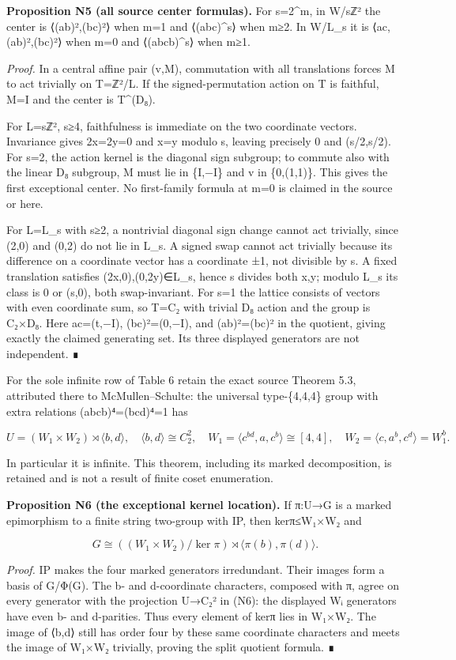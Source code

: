 \documentclass[
  10pt,
  letterpaper,
]{article}
\begin{document}
\textbf{Proposition N5 (all source center formulas).} For s=2\^{}m, in
W/sℤ² the center is ⟨(ab)²,(bc)²⟩ when m=1 and ⟨(abc)\^{}s⟩ when m≥2. In
W/L\_s it is ⟨ac,(ab)²,(bc)²⟩ when m=0 and ⟨(abcb)\^{}s⟩ when m≥1.

\emph{Proof.} In a central affine pair (v,M), commutation with all
translations forces M to act trivially on T=ℤ²/L. If the
signed-permutation action on T is faithful, M=I and the center is
T\^{}(D₈).

For L=sℤ², s≥4, faithfulness is immediate on the two coordinate vectors.
Invariance gives 2x=2y=0 and x=y modulo s, leaving precisely 0 and
(s/2,s/2). For s=2, the action kernel is the diagonal sign subgroup; to
commute also with the linear D₈ subgroup, M must lie in \{I,−I\} and v
in \{0,(1,1)\}. This gives the first exceptional center. No first-family
formula at m=0 is claimed in the source or here.

For L=L\_s with s≥2, a nontrivial diagonal sign change cannot act
trivially, since (2,0) and (0,2) do not lie in L\_s. A signed swap
cannot act trivially because its difference on a coordinate vector has a
coordinate ±1, not divisible by s. A fixed translation satisfies
(2x,0),(0,2y)∈L\_s, hence s divides both x,y; modulo L\_s its class is 0
or (s,0), both swap-invariant. For s=1 the lattice consists of vectors
with even coordinate sum, so T=C₂ with trivial D₈ action and the group
is C₂×D₈. Here ac=(t,−I), (bc)²=(0,−I), and (ab)²=(bc)² in the quotient,
giving exactly the claimed generating set. Its three displayed
generators are not independent. ∎

For the sole infinite row of Table 6 retain the exact source Theorem
5.3, attributed there to McMullen--Schulte: the universal type-\{4,4,4\}
group with extra relations (abcb)⁴=(bcd)⁴=1 has

\[
U=(W_1\times W_2)\rtimes\langle b,d\rangle,
\quad \langle b,d\rangle\cong C_2^2,\quad
W_1=\langle c^{bd},a,c^b\rangle\cong[4,4],\quad
W_2=\langle c,a^b,c^d\rangle=W_1^b.
\tag{N6}
\]

In particular it is infinite. This theorem, including its marked
decomposition, is retained and is not a result of finite coset
enumeration.

\textbf{Proposition N6 (the exceptional kernel location).} If π:U→G is a
marked epimorphism to a finite string two-group with IP, then kerπ≤W₁×W₂
and

\[
G\cong ((W_1\times W_2)/\ker\pi)\rtimes\langle\pi(b),\pi(d)\rangle.
\tag{N7}
\]

\emph{Proof.} IP makes the four marked generators irredundant. Their
images form a basis of G/Φ(G). The b- and d-coordinate characters,
composed with π, agree on every generator with the projection U→C₂² in
(N6): the displayed Wᵢ generators have even b- and d-parities. Thus
every element of kerπ lies in W₁×W₂. The image of ⟨b,d⟩ still has order
four by these same coordinate characters and meets the image of W₁×W₂
trivially, proving the split quotient formula. ∎
\end{document}
